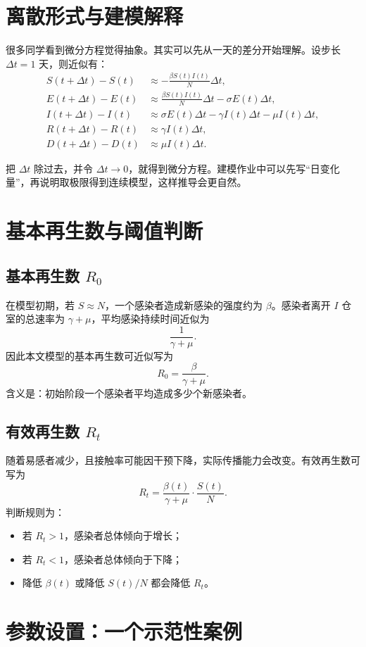 \documentclass[UTF8,12pt,a4paper]{ctexart}
\begin{document}
\section{离散形式与建模解释}
很多同学看到微分方程觉得抽象。其实可以先从一天的差分开始理解。设步长 $\Delta t=1$ 天，则近似有：
\begin{align*}
S(t+\Delta t)-S(t)&\approx -\frac{\beta S(t)I(t)}{N}\Delta t,\\
E(t+\Delta t)-E(t)&\approx \frac{\beta S(t)I(t)}{N}\Delta t-\sigma E(t)\Delta t,\\
I(t+\Delta t)-I(t)&\approx \sigma E(t)\Delta t-\gamma I(t)\Delta t-\mu I(t)\Delta t,\\
R(t+\Delta t)-R(t)&\approx \gamma I(t)\Delta t,\\
D(t+\Delta t)-D(t)&\approx \mu I(t)\Delta t.
\end{align*}

把 $\Delta t$ 除过去，并令 $\Delta t\to0$，就得到微分方程。建模作业中可以先写“日变化量”，再说明取极限得到连续模型，这样推导会更自然。

\section{基本再生数与阈值判断}
\subsection{基本再生数 $R_0$}
在模型初期，若 $S\approx N$，一个感染者造成新感染的强度约为 $\beta$。感染者离开 $I$ 仓室的总速率为 $\gamma+\mu$，平均感染持续时间近似为
\[
\frac{1}{\gamma+\mu}.
\]
因此本文模型的基本再生数可近似写为
\[
R_0=\frac{\beta}{\gamma+\mu}.
\]
含义是：初始阶段一个感染者平均造成多少个新感染者。

\subsection{有效再生数 $R_t$}
随着易感者减少，且接触率可能因干预下降，实际传播能力会改变。有效再生数可写为
\[
R_t=\frac{\beta(t)}{\gamma+\mu}\cdot \frac{S(t)}{N}.
\]
判断规则为：
\begin{itemize}
\item 若 $R_t>1$，感染者总体倾向于增长；
\item 若 $R_t<1$，感染者总体倾向于下降；
\item 降低 $\beta(t)$ 或降低 $S(t)/N$ 都会降低 $R_t$。
\end{itemize}

\section{参数设置：一个示范性案例}
\end{document}
